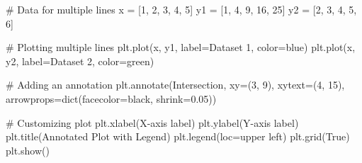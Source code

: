 \documentclass[
  letterpaper,
  DIV=11,
  numbers=noendperiod]{scrreprt}
\newenvironment{Shaded}{\begin{snugshade}}{\end{snugshade}}
\newcommand{\BuiltInTok}[1]{\textcolor[rgb]{0.00,0.23,0.31}{#1}}
\newcommand{\CommentTok}[1]{\textcolor[rgb]{0.37,0.37,0.37}{#1}}
\newcommand{\DecValTok}[1]{\textcolor[rgb]{0.68,0.00,0.00}{#1}}
\newcommand{\FloatTok}[1]{\textcolor[rgb]{0.68,0.00,0.00}{#1}}
\newcommand{\NormalTok}[1]{\textcolor[rgb]{0.00,0.23,0.31}{#1}}
\newcommand{\OperatorTok}[1]{\textcolor[rgb]{0.37,0.37,0.37}{#1}}
\newcommand{\StringTok}[1]{\textcolor[rgb]{0.13,0.47,0.30}{#1}}
\newcommand{\VariableTok}[1]{\textcolor[rgb]{0.07,0.07,0.07}{#1}}
\begin{document}
\begin{Shaded}
\begin{Highlighting}[]
\CommentTok{\# Data for multiple lines}
\NormalTok{x }\OperatorTok{=}\NormalTok{ [}\DecValTok{1}\NormalTok{, }\DecValTok{2}\NormalTok{, }\DecValTok{3}\NormalTok{, }\DecValTok{4}\NormalTok{, }\DecValTok{5}\NormalTok{]}
\NormalTok{y1 }\OperatorTok{=}\NormalTok{ [}\DecValTok{1}\NormalTok{, }\DecValTok{4}\NormalTok{, }\DecValTok{9}\NormalTok{, }\DecValTok{16}\NormalTok{, }\DecValTok{25}\NormalTok{]}
\NormalTok{y2 }\OperatorTok{=}\NormalTok{ [}\DecValTok{2}\NormalTok{, }\DecValTok{3}\NormalTok{, }\DecValTok{4}\NormalTok{, }\DecValTok{5}\NormalTok{, }\DecValTok{6}\NormalTok{]}

\CommentTok{\# Plotting multiple lines}
\NormalTok{plt.plot(x, y1, label}\OperatorTok{=}\StringTok{\textquotesingle{}Dataset 1\textquotesingle{}}\NormalTok{, color}\OperatorTok{=}\StringTok{\textquotesingle{}blue\textquotesingle{}}\NormalTok{)}
\NormalTok{plt.plot(x, y2, label}\OperatorTok{=}\StringTok{\textquotesingle{}Dataset 2\textquotesingle{}}\NormalTok{, color}\OperatorTok{=}\StringTok{\textquotesingle{}green\textquotesingle{}}\NormalTok{)}

\CommentTok{\# Adding an annotation}
\NormalTok{plt.annotate(}\StringTok{\textquotesingle{}Intersection\textquotesingle{}}\NormalTok{, xy}\OperatorTok{=}\NormalTok{(}\DecValTok{3}\NormalTok{, }\DecValTok{9}\NormalTok{), xytext}\OperatorTok{=}\NormalTok{(}\DecValTok{4}\NormalTok{, }\DecValTok{15}\NormalTok{),}
\NormalTok{             arrowprops}\OperatorTok{=}\BuiltInTok{dict}\NormalTok{(facecolor}\OperatorTok{=}\StringTok{\textquotesingle{}black\textquotesingle{}}\NormalTok{, shrink}\OperatorTok{=}\FloatTok{0.05}\NormalTok{))}

\CommentTok{\# Customizing plot}
\NormalTok{plt.xlabel(}\StringTok{\textquotesingle{}X{-}axis label\textquotesingle{}}\NormalTok{)}
\NormalTok{plt.ylabel(}\StringTok{\textquotesingle{}Y{-}axis label\textquotesingle{}}\NormalTok{)}
\NormalTok{plt.title(}\StringTok{\textquotesingle{}Annotated Plot with Legend\textquotesingle{}}\NormalTok{)}
\NormalTok{plt.legend(loc}\OperatorTok{=}\StringTok{\textquotesingle{}upper left\textquotesingle{}}\NormalTok{)}
\NormalTok{plt.grid(}\VariableTok{True}\NormalTok{)}
\NormalTok{plt.show()}
\end{Highlighting}
\end{Shaded}
\end{document}
